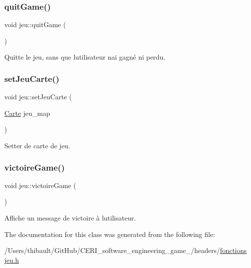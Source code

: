 \subsubsection{\texorpdfstring{quit\+Game()}{quitGame()}}
{\footnotesize\ttfamily void jeu\+::quit\+Game (\begin{DoxyParamCaption}{ }\end{DoxyParamCaption})}



Quitte le jeu, sans que l\textquotesingle{}utilisateur n\textquotesingle{}ai gagné ni perdu. 

\mbox{\label{classjeu_a53cb5e2a1c7e0925aca09885ff959efc}} 
\subsubsection{\texorpdfstring{set\+Jeu\+Carte()}{setJeuCarte()}}
{\footnotesize\ttfamily void jeu\+::set\+Jeu\+Carte (\begin{DoxyParamCaption}\item[{\hyperlink{class_carte}{Carte}}]{jeu\+\_\+map }\end{DoxyParamCaption})}



Setter de carte de jeu. 

\mbox{\label{classjeu_a7c769fff9b23935aef40d6633d774a96}} 
\subsubsection{\texorpdfstring{victoire\+Game()}{victoireGame()}}
{\footnotesize\ttfamily void jeu\+::victoire\+Game (\begin{DoxyParamCaption}{ }\end{DoxyParamCaption})}



Affiche un message de victoire à l\textquotesingle{}utilisateur. 



The documentation for this class was generated from the following file\+:\begin{DoxyCompactItemize}
\item 
/\+Users/thibault/\+Git\+Hub/\+C\+E\+R\+I\+\_\+software\+\_\+engineering\+\_\+game\+\_/headers/\hyperlink{fonctionsjeu_8h}{fonctionsjeu.\+h}\end{DoxyCompactItemize}
